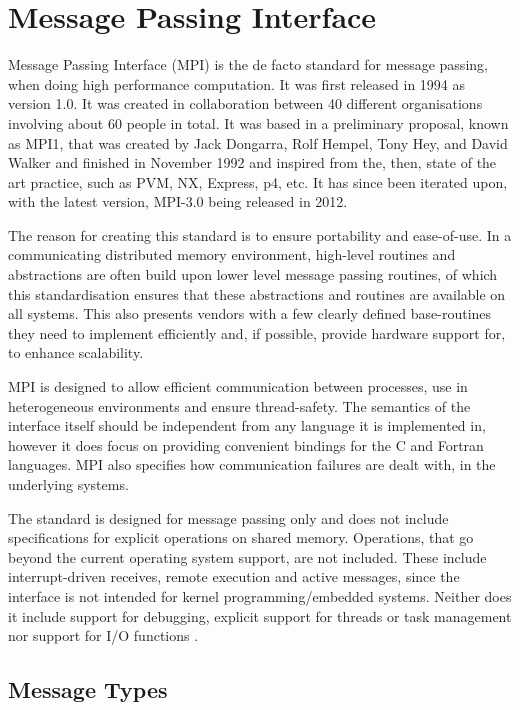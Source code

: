 \section{Message Passing Interface}
Message Passing Interface (MPI) is the de facto standard for message passing, when doing high performance computation. It was first released in 1994 as version 1.0. It was created in collaboration between 40 different organisations involving about 60 people in total. It was based in a preliminary proposal, known as MPI1, that was created by Jack Dongarra, Rolf Hempel, Tony Hey, and David Walker and finished in November 1992 and inspired from the, then, state of the art practice, such as PVM, NX, Express, p4, etc. It has since been iterated upon, with the latest version, MPI-3.0 being released in 2012.

The reason for creating this standard is to ensure portability and ease-of-use. In a communicating distributed memory environment, high-level routines and abstractions are often build upon lower level message passing routines, of which this standardisation ensures that these abstractions and routines are available on all systems. This also presents vendors with a few clearly defined base-routines they need to implement efficiently and, if possible, provide hardware support for, to enhance scalability.

MPI is designed to allow efficient communication between processes, use in heterogeneous environments and ensure thread-safety. The semantics of the interface itself should be independent from any language it is implemented in, however it does focus on providing convenient bindings for the C and Fortran languages. MPI also specifies how communication failures are dealt with, in the underlying systems.

The standard is designed for message passing only and does not include specifications for explicit operations on shared memory. Operations, that go beyond the current operating system support, are not included. These include interrupt-driven receives, remote execution and active messages, since the interface is not intended for kernel programming/embedded systems. Neither does it include support for debugging, explicit support for threads or task management nor support for I/O functions \cite{mpi1}.

\subsection{Message Types}

